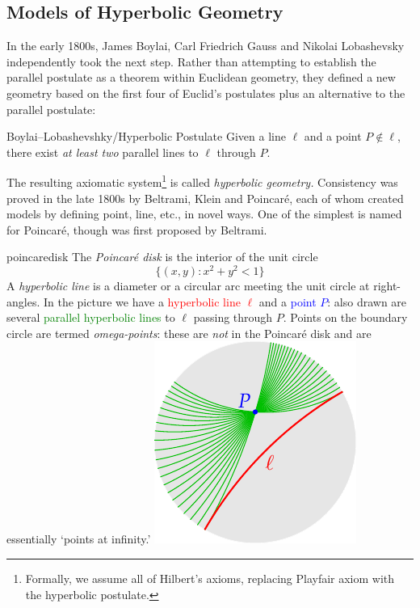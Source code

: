 \clearpage



\subsection{Models of Hyperbolic Geometry}\label{sec:hyp-models}

In the early 1800s, James Boylai, Carl Friedrich Gauss and Nikolai Lobashevsky independently took the next step. Rather than attempting to establish the parallel postulate as a theorem within Euclidean geometry, they defined a new geometry based on the first four of Euclid's postulates plus an alternative to the parallel postulate:

\begin{axiom}{Boylai--Lobashevshky/Hyperbolic Postulate}{}
Given a line $\ell$ and a point $P\not\in\ell$, there exist \emph{at least two} parallel lines to $\ell$ through $P$.
\end{axiom}

The resulting axiomatic system\footnote{Formally, we assume all of Hilbert's axioms, replacing Playfair axiom with the hyperbolic postulate.} is called \emph{hyperbolic geometry.} Consistency was proved in the late 1800s by Beltrami, Klein and Poincaré, each of whom created models by defining point, line, etc., in novel ways. One of the simplest is named for Poincaré, though was first proposed by Beltrami.

\begin{defn}[lower separated=false, sidebyside, sidebyside align=top seam, sidebyside gap=0pt, righthand width=0.3\linewidth]{}{poincaredisk}
The \emph{Poincaré disk} is the interior of the unit circle
	\[\bigl\{(x,y):x^2+y^2<1\bigr\}\]
A \emph{hyperbolic line} is a diameter or a circular arc meeting the unit circle at right-angles.\smallbreak
In the picture we have a \textcolor{red}{hyperbolic line $\ell$} and a \textcolor{blue}{point $P$}: also drawn are several \textcolor{Green}{parallel hyperbolic lines} to $\ell$ passing through $P$.\smallbreak
Points on the boundary circle are termed \emph{omega-points}: these are \emph{not} in the Poincaré disk and are essentially `points at infinity.' 
\tcblower
\flushright\includegraphics{models-parallels}
\end{defn}

